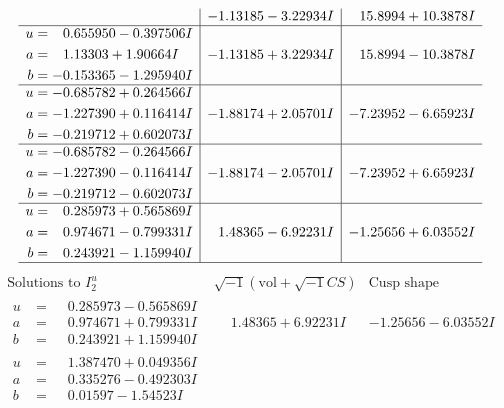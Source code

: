\documentclass[1p]{elsarticle_modified}
\theoremstyle{definition}
\newcommand{\I}{\sqrt{-1}}
\begin{document}
$$\begin{array}{c|c|c}
 & -1.13185 - 3.22934 I & \phantom{-}15.8994 + 10.3878 I \\ \hline\begin{aligned}
u &= \phantom{-}0.655950 - 0.397506 I \\
a &= \phantom{-}1.13303 + 1.90664 I \\
b &= -0.153365 - 1.295940 I\end{aligned}
 & -1.13185 + 3.22934 I & \phantom{-}15.8994 - 10.3878 I \\ \hline\begin{aligned}
u &= -0.685782 + 0.264566 I \\
a &= -1.227390 + 0.116414 I \\
b &= -0.219712 + 0.602073 I\end{aligned}
 & -1.88174 + 2.05701 I & -7.23952 - 6.65923 I \\ \hline\begin{aligned}
u &= -0.685782 - 0.264566 I \\
a &= -1.227390 - 0.116414 I \\
b &= -0.219712 - 0.602073 I\end{aligned}
 & -1.88174 - 2.05701 I & -7.23952 + 6.65923 I \\ \hline\begin{aligned}
u &= \phantom{-}0.285973 + 0.565869 I \\
a &= \phantom{-}0.974671 - 0.799331 I \\
b &= \phantom{-}0.243921 - 1.159940 I\end{aligned}
 & \phantom{-}1.48365 - 6.92231 I & -1.25656 + 6.03552 I\\
 \hline 
 \end{array}$$\newpage$$\begin{array}{c|c|c}  
\text{Solutions to }I^u_{2}& \I (\text{vol} + \sqrt{-1}CS) & \text{Cusp shape}\\
 \hline 
\begin{aligned}
u &= \phantom{-}0.285973 - 0.565869 I \\
a &= \phantom{-}0.974671 + 0.799331 I \\
b &= \phantom{-}0.243921 + 1.159940 I\end{aligned}
 & \phantom{-}1.48365 + 6.92231 I & -1.25656 - 6.03552 I \\ \hline\begin{aligned}
u &= \phantom{-}1.387470 + 0.049356 I \\
a &= \phantom{-}0.335276 - 0.492303 I \\
b &= \phantom{-}0.01597 - 1.54523 I\end{aligned}

\end{array}$$
\end{document}
